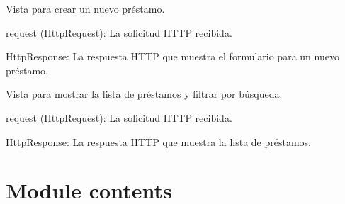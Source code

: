 \documentclass[letterpaper,10pt,spanish]{sphinxmanual}
\begin{document}
\begin{fulllineitems}
\label{\detokenize{modules/appprestamos:appprestamos.views.nuevo_prestamo}}
\pysigstartsignatures
{}
\pysigstopsignatures
\sphinxAtStartPar
Vista para crear un nuevo préstamo.
\begin{description}
\sphinxAtStartPar
request (HttpRequest): La solicitud HTTP recibida.

\sphinxAtStartPar
HttpResponse: La respuesta HTTP que muestra el formulario para un nuevo préstamo.

\end{description}

\end{fulllineitems}


\begin{fulllineitems}
\label{\detokenize{modules/appprestamos:appprestamos.views.prestamos}}
\pysigstartsignatures
{}
\pysigstopsignatures
\sphinxAtStartPar
Vista para mostrar la lista de préstamos y filtrar por búsqueda.
\begin{description}
\sphinxAtStartPar
request (HttpRequest): La solicitud HTTP recibida.

\sphinxAtStartPar
HttpResponse: La respuesta HTTP que muestra la lista de préstamos.

\end{description}

\end{fulllineitems}



\section{Module contents}
\label{\detokenize{modules/appprestamos:module-appprestamos}}\label{\detokenize{modules/appprestamos:module-contents}}
\sphinxstepscope
\end{document}
